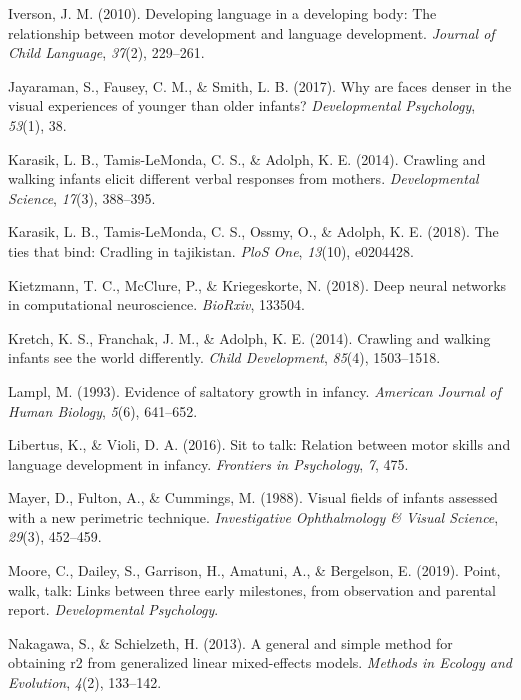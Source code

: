 \documentclass[english,man]{apa6}
\begin{document}
\hypertarget{ref-iverson2010}{}
Iverson, J. M. (2010). Developing language in a developing body: The
relationship between motor development and language development.
\emph{Journal of Child Language}, \emph{37}(2), 229--261.

\hypertarget{ref-jayaraman2017faces}{}
Jayaraman, S., Fausey, C. M., \& Smith, L. B. (2017). Why are faces
denser in the visual experiences of younger than older infants?
\emph{Developmental Psychology}, \emph{53}(1), 38.

\hypertarget{ref-karasik2014}{}
Karasik, L. B., Tamis-LeMonda, C. S., \& Adolph, K. E. (2014). Crawling
and walking infants elicit different verbal responses from mothers.
\emph{Developmental Science}, \emph{17}(3), 388--395.

\hypertarget{ref-karasik2018ties}{}
Karasik, L. B., Tamis-LeMonda, C. S., Ossmy, O., \& Adolph, K. E.
(2018). The ties that bind: Cradling in tajikistan. \emph{PloS One},
\emph{13}(10), e0204428.

\hypertarget{ref-kietzmann2018deep}{}
Kietzmann, T. C., McClure, P., \& Kriegeskorte, N. (2018). Deep neural
networks in computational neuroscience. \emph{BioRxiv}, 133504.

\hypertarget{ref-kretch2014}{}
Kretch, K. S., Franchak, J. M., \& Adolph, K. E. (2014). Crawling and
walking infants see the world differently. \emph{Child Development},
\emph{85}(4), 1503--1518.

\hypertarget{ref-lampl1993evidence}{}
Lampl, M. (1993). Evidence of saltatory growth in infancy.
\emph{American Journal of Human Biology}, \emph{5}(6), 641--652.

\hypertarget{ref-libertus2016sit}{}
Libertus, K., \& Violi, D. A. (2016). Sit to talk: Relation between
motor skills and language development in infancy. \emph{Frontiers in
Psychology}, \emph{7}, 475.

\hypertarget{ref-mayer1988}{}
Mayer, D., Fulton, A., \& Cummings, M. (1988). Visual fields of infants
assessed with a new perimetric technique. \emph{Investigative
Ophthalmology \& Visual Science}, \emph{29}(3), 452--459.

\hypertarget{ref-moore2019point}{}
Moore, C., Dailey, S., Garrison, H., Amatuni, A., \& Bergelson, E.
(2019). Point, walk, talk: Links between three early milestones, from
observation and parental report. \emph{Developmental Psychology}.

\hypertarget{ref-nakagawa2013general}{}
Nakagawa, S., \& Schielzeth, H. (2013). A general and simple method for
obtaining r2 from generalized linear mixed-effects models. \emph{Methods
in Ecology and Evolution}, \emph{4}(2), 133--142.
\end{document}
